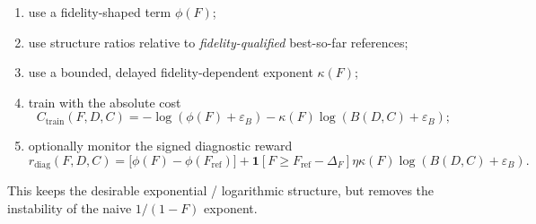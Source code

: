 \documentclass[11pt]{article}
\begin{document}
\begin{enumerate}[leftmargin=*]
\item use a fidelity-shaped term $\phi(F)$;
\item use structure ratios relative to \emph{fidelity-qualified} best-so-far references;
\item use a bounded, delayed fidelity-dependent exponent $\kappa(F)$;
\item train with the absolute cost
\[
C_{\mathrm{train}}(F,D,C) = -\log(\phi(F)+\varepsilon_B) - \kappa(F)\log(B(D,C)+\varepsilon_B);
\]
\item optionally monitor the signed diagnostic reward
\[
r_{\mathrm{diag}}(F,D,C)
=
\bigl[\phi(F)-\phi(F_{\mathrm{ref}})\bigr]
+
\mathbf{1}[F\ge F_{\mathrm{ref}}-\Delta_F]\eta\kappa(F)\log(B(D,C)+\varepsilon_B).
\]
\end{enumerate}

This keeps the desirable exponential / logarithmic structure, but removes the instability
of the naive $1/(1-F)$ exponent.
\end{document}
